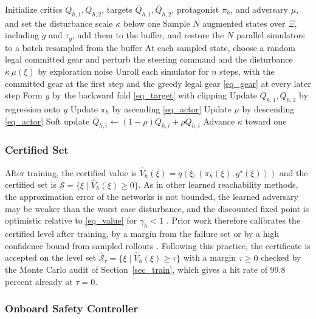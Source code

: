 \documentclass[lettersize,journal]{IEEEtran}
\newcommand{\calS}{\mathcal{S}}
\begin{document}
\begin{algorithm}[!t]
\caption{Adversarial Learning of the Dwell Constrained Safety Value}
\label{alg_ris}
\begin{algorithmic}[1]
\STATE Initialize critics $Q_{h,1}, Q_{h,2}$, targets $\bar{Q}_{h,1}, \bar{Q}_{h,2}$, protagonist $\pi_h$, and adversary $\mu$, and set the disturbance scale $\kappa$ below one
\STATE Sample $N$ augmented states over $\Xi$, including $g$ and $\tau_g$, add them to the buffer, and restore the $N$ parallel simulators to a batch resampled from the buffer
\STATE At each sampled state, choose a random legal committed gear and perturb the steering command and the disturbance $\kappa\,\mu(\xi)$ by exploration noise
\STATE Unroll each simulator for $n$ steps, with the committed gear at the first step and the greedy legal gear \eqref{eq_gear} at every later step
\STATE Form $y$ by the backward fold \eqref{eq_target} with clipping
\STATE Update $Q_{h,1}, Q_{h,2}$ by regression onto $y$
\STATE Update $\pi_h$ by ascending \eqref{eq_actor}
\STATE Update $\mu$ by descending \eqref{eq_actor}
\STATE Soft update $\bar{Q}_{h,i} \gets (1-\rho)\bar{Q}_{h,i} + \rho Q_{h,i}$
\STATE Advance $\kappa$ toward one
\ENDFOR
\end{algorithmic}
\end{algorithm}

\subsubsection{Certified Set}
After training, the certified value is $\hat V_h(\xi) = q(\xi, (\pi_h(\xi), g^\star(\xi)))$ and the certified set is $\hat{\calS} = \{\xi \mid \hat V_h(\xi) \ge 0\}$. As in other learned reachability methods, the approximation error of the networks is not bounded, the learned adversary may be weaker than the worst case disturbance, and the discounted fixed point is optimistic relative to \eqref{eq_value} for $\gamma_h < 1$ \cite{hsu2023sim2lab,li2025certifiable}. Prior work therefore calibrates the certified level after training, by a margin from the failure set \cite{hsu2023sim2lab} or by a high confidence bound from sampled rollouts \cite{borquez2024filtering}. Following this practice, the certificate is accepted on the level set $\hat{\calS}_\tau = \{\xi \mid \hat V_h(\xi) \ge \tau\}$ with a margin $\tau \ge 0$ checked by the Monte Carlo audit of Section~\ref{sec_train}, which gives a hit rate of 99.8 percent already at $\tau = 0$.

\subsubsection{Onboard Safety Controller}
\end{document}
